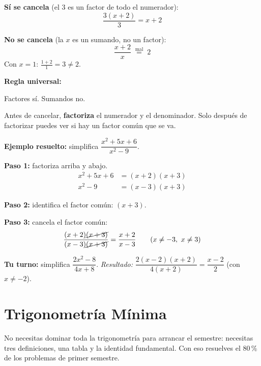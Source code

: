 \documentclass[12pt, letterpaper]{article}
\begin{document}
\begin{cuadrosolucion}
  \textbf{Sí se cancela} (el 3 es un factor de todo el numerador):
  \[
    \frac{3(x+2)}{3} = x+2
  \]
\end{cuadrosolucion}

\begin{cuadroadvertencia}
  \textbf{No se cancela} (la $x$ es un sumando, no un factor):
  \[
    \frac{x+2}{x} \;\overset{\text{mal}}{=}\; 2
  \]
  Con $x = 1$: $\frac{1+2}{1} = 3 \neq 2$.
\end{cuadroadvertencia}

\begin{cuadroteoria}
  \textbf{Regla universal:}\\[4pt]
  \centerline{\nxheav Factores sí. Sumandos no.}
  \vspace{4pt}
  Antes de cancelar, \textbf{factoriza} el numerador y el denominador. Solo después de factorizar puedes ver si hay un factor común que se va.
\end{cuadroteoria}

\begin{cuadropasos}
  \textbf{Ejemplo resuelto:} simplifica $\dfrac{x^2 + 5x + 6}{x^2 - 9}$.

  \textbf{Paso 1:} factoriza arriba y abajo.
  \begin{align*}
    x^2 + 5x + 6 &= (x+2)(x+3) \\
    x^2 - 9       &= (x-3)(x+3)
  \end{align*}

  \textbf{Paso 2:} identifica el factor común: $(x+3)$.

  \textbf{Paso 3:} cancela el factor común:
  \[
    \frac{(x+2)\cancel{(x+3)}}{(x-3)\cancel{(x+3)}} = \frac{x+2}{x-3} \qquad (x \neq -3,\ x \neq 3)
  \]
\end{cuadropasos}

\noindent\textbf{Tu turno:} simplifica $\dfrac{2x^2 - 8}{4x + 8}$. \emph{Resultado:} $\dfrac{2(x-2)(x+2)}{4(x+2)} = \dfrac{x-2}{2}$ (con $x \neq -2$).


\section{Trigonometría Mínima}

No necesitas dominar toda la trigonometría para arrancar el semestre: necesitas tres definiciones, una tabla y la identidad fundamental. Con eso resuelves el 80\,\% de los problemas de primer semestre.
\end{document}
